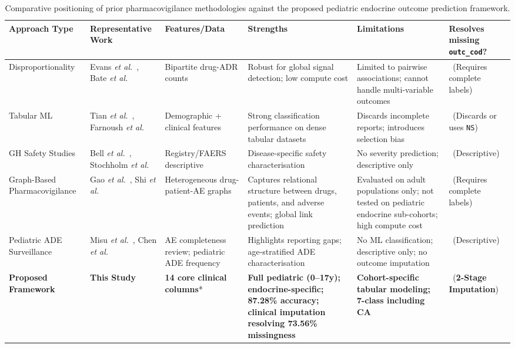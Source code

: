\documentclass[10pt,twocolumn]{article}
\newcommand{\etal}{\textit{et al.}\xspace}
\newcommand{\cmark}{{\color{jpbiGreen}\ding{51}}}
\newcommand{\xmark}{{\color{jpbiRed}\ding{55}}}
\begin{document}
\begin{table}[t]
\caption{Comparative positioning of prior pharmacovigilance methodologies against the proposed pediatric endocrine outcome prediction framework.}
\label{tab:related_work}
\centering\small\setlength{\tabcolsep}{5pt}
\begin{tabularx}{\textwidth}{|>{\raggedright\arraybackslash\hsize=0.7\hsize}X|>{\raggedright\arraybackslash\hsize=0.8\hsize}X|>{\raggedright\arraybackslash\hsize=1.0\hsize}X|>{\raggedright\arraybackslash\hsize=1.3\hsize}X|>{\raggedright\arraybackslash\hsize=1.3\hsize}X|>{\centering\arraybackslash\hsize=0.9\hsize}X|}
\hline
\rowcolor{tableHead}
\color{white}\textbf{Approach Type} & \color{white}\textbf{Representative Work} & \color{white}\textbf{Features/Data} & \color{white}\textbf{Strengths} & \color{white}\textbf{Limitations} & \color{white}\textbf{Resolves missing \texttt{outc\_cod}?}\\
\hline
\rowcolor{rowA} Disproportionality & Evans \etal~\cite{evans2001}, Bate \etal~\cite{bate1998} & Bipartite drug-ADR counts & Robust for global signal detection; low compute cost & Limited to pairwise associations; cannot handle multi-variable outcomes & \xmark\ (Requires complete labels) \\
\hline
\rowcolor{rowB} Tabular ML & Tian \etal~\cite{tian2025}, Farnoush \etal~\cite{farnoush2024} & Demographic + clinical features & Strong classification performance on dense tabular datasets & Discards incomplete reports; introduces selection bias & \xmark\ (Discards or uses \texttt{NS}) \\
\hline
\rowcolor{rowA} GH Safety Studies & Bell \etal~\cite{bell2010}, Stochholm \etal~\cite{stochholm2020} & Registry/FAERS descriptive & Disease-specific safety characterisation & No severity prediction; descriptive only & \xmark\ (Descriptive) \\
\hline
\rowcolor{rowB} Graph-Based Pharmacovigilance & Gao \etal~\cite{gao2025}, Shi \etal~\cite{shi2026} & Heterogeneous drug-patient-AE graphs & Captures relational structure between drugs, patients, and adverse events; global link prediction & Evaluated on adult populations only; not tested on pediatric endocrine sub-cohorts; high compute cost & \xmark\ (Requires complete labels) \\
\hline
\rowcolor{rowA} Pediatric ADE Surveillance & Misu \etal~\cite{misu2023}, Chen \etal~\cite{chen2020thyroid} & AE completeness review; pediatric ADE frequency & Highlights reporting gaps; age-stratified ADE characterisation & No ML classification; descriptive only; no outcome imputation & \xmark\ (Descriptive) \\
\hline
\rowcolor{jpbiLight}
\textbf{Proposed Framework} & \textbf{This Study} & \textbf{14 core clinical columns}* & \textbf{Full pediatric (0--17y); endocrine-specific; 87.28\% accuracy; clinical imputation resolving 73.56\% missingness} & \textbf{Cohort-specific tabular modeling; 7-class including CA} & \cmark\ (\textbf{2-Stage Imputation}) \\
\hline
\end{tabularx}
 

\end{table}
\end{document}
